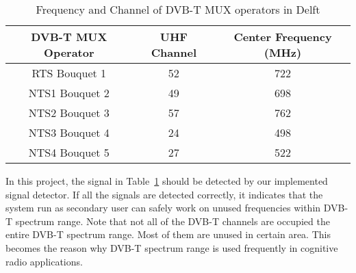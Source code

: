 \begin{table}[h]
    \centering \caption{Frequency and Channel of DVB-T MUX operators in Delft}
    \begin{tabular}{c|c|c}
    \hline
    \textbf{DVB-T MUX Operator}     & \textbf{UHF Channel} & \textbf{Center Frequency (MHz)} \\ \hline \hline
    RTS Bouquet 1          & 52          & 722                    \\ \hline
    NTS1 Bouquet 2         & 49          & 698                    \\ \hline
    NTS2   			Bouquet 3    & 57          & 762                    \\ \hline
    NTS3 Bouquet 4         & 24          & 498                    \\ \hline
    NTS4  			Bouquet  			5 & 27          & 522                    \\ \hline
    \end{tabular}
    \label{tab:delft-dvb}
\end{table}


In this project, the signal in Table~\ref{tab:delft-dvb} should be detected by our implemented signal detector. If all the signals are detected correctly, it indicates that the system run as secondary user can safely work on unused frequencies within DVB-T spectrum range. Note that not all of the DVB-T channels are occupied the entire DVB-T spectrum range. Most of them are unused in certain area. This becomes the reason why DVB-T spectrum range is used frequently in cognitive radio applications.